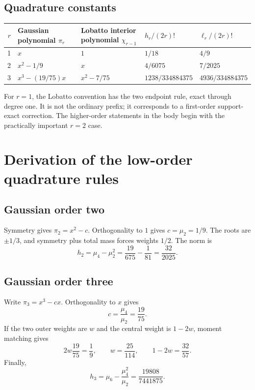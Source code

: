 \documentclass[11pt]{article}
\numberwithin{equation}{section}
\theoremstyle{definition}
\theoremstyle{remark}
\begin{document}
\subsection{Quadrature constants}

\begin{center}
\begin{tabularx}{0.98\textwidth}{@{}rXXll@{}}
\toprule
$r$ & Gaussian polynomial $\pi_r$ & Lobatto interior polynomial $\chi_{r-1}$ & $h_r/(2r)!$ & $\ell_r/(2r)!$\\
\midrule
1 & $x$ & $1$ & $1/18$ & $4/9$\\
2 & $x^2-1/9$ & $x$ & $4/6075$ & $7/2025$\\
3 & $x^3-(19/75)x$ & $x^2-7/75$ & $1238/334884375$ & $4936/334884375$\\
\bottomrule
\end{tabularx}
\end{center}

For $r=1$, the Lobatto convention has the two endpoint rule, exact through degree one.  It is not the ordinary prefix; it corresponds to a first-order support-exact correction.  The higher-order statements in the body begin with the practically important $r=2$ case.

\section{Derivation of the low-order quadrature rules}
\label{p1:app:low-rules}

\subsection{Gaussian order two}

Symmetry gives $\pi_2=x^2-c$.  Orthogonality to $1$ gives $c=\mu_2=1/9$.  The roots are $\pm1/3$, and symmetry plus total mass forces weights $1/2$.  The norm is
\[
 h_2=\mu_4-\mu_2^2
 =\frac{19}{675}-\frac1{81}
 =\frac{32}{2025}.
\]

\subsection{Gaussian order three}

Write $\pi_3=x^3-cx$.  Orthogonality to $x$ gives
\[
 c=\frac{\mu_4}{\mu_2}=\frac{19}{75}.
\]
If the two outer weights are $w$ and the central weight is $1-2w$, moment matching gives
\[
 2w\frac{19}{75}=\frac19,
 \qquad
 w=\frac{25}{114},
 \qquad
 1-2w=\frac{32}{57}.
\]
Finally,
\[
 h_3=\mu_6-\frac{\mu_4^2}{\mu_2}
 =\frac{19808}{7441875}.
\]
\end{document}
